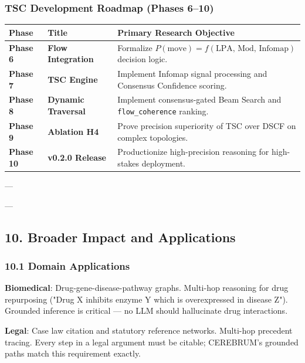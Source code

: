 \documentclass[10pt,journal,compsoc]{IEEEtran}
\begin{document}
\subsubsection{TSC Development Roadmap (Phases 6–10)}

\begin{center}
{\footnotesize
\begin{tabularx}{\columnwidth}{|>{\raggedright\arraybackslash}X|>{\raggedright\arraybackslash}X|>{\raggedright\arraybackslash}X|}
\hline
Phase & Title & Primary Research Objective \\ \hline
\textbf{Phase 6} & \textbf{Flow Integration} & Formalize $P(\text{move}) = f(\text{LPA, Mod, Infomap})$ decision logic. \\ \hline
\textbf{Phase 7} & \textbf{TSC Engine} & Implement Infomap signal processing and Consensus Confidence scoring. \\ \hline
\textbf{Phase 8} & \textbf{Dynamic Traversal} & Implement consensus-gated Beam Search and \texttt{flow\_coherence} ranking. \\ \hline
\textbf{Phase 9} & \textbf{Ablation H4} & Prove precision superiority of TSC over DSCF on complex topologies. \\ \hline
\textbf{Phase 10} & \textbf{v0.2.0 Release} & Produc\-tionize high-precision reasoning for high-stakes deployment. \\ \hline
\end{tabularx}
}
\end{center}

---

---

\subsection{10. Broader Impact and Applic\-ations}

\subsubsection{10.1 Domain Applic\-ations}

\textbf{Biomedical}: Drug-gene-disease-pathway graphs. Multi-hop reasoning for drug
repurposing ("Drug X inhibits enzyme Y which is overe\-xpressed in disease Z").
Grounded inference is critical — no LLM should hallucinate drug inter\-actions.

\textbf{Legal}: Case law citation and statutory reference networks. Multi-hop
precedent tracing. Every step in a legal argument must be citable; CEREBRUM's
grounded paths match this requirement exactly.
\end{document}
